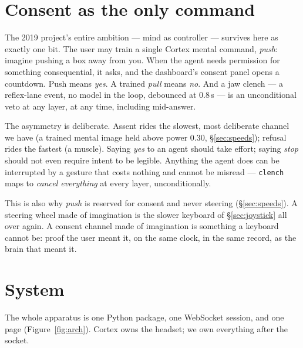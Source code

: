 \documentclass{article}
\begin{document}
\section{Consent as the only command}
\label{sec:consent}

The 2019 project's entire ambition --- mind as controller --- survives here as exactly one bit. The user may train a single Cortex mental command, \emph{push}: imagine pushing a box away from you. When the agent needs permission for something consequential, it asks, and the dashboard's consent panel opens a countdown. Push means \emph{yes}. A trained \emph{pull} means \emph{no}. And a jaw clench --- a reflex-lane event, no model in the loop, debounced at 0.8\,s --- is an unconditional veto at any layer, at any time, including mid-answer.

The asymmetry is deliberate. Assent rides the slowest, most deliberate channel we have (a trained mental image held above power 0.30, \S\ref{sec:speeds}); refusal rides the fastest (a muscle). Saying \emph{yes} to an agent should take effort; saying \emph{stop} should not even require intent to be legible. Anything the agent does can be interrupted by a gesture that costs nothing and cannot be misread --- \texttt{clench} maps to \emph{cancel everything} at every layer, unconditionally.

This is also why \emph{push} is reserved for consent and never steering (\S\ref{sec:speeds}). A steering wheel made of imagination is the slower keyboard of \S\ref{sec:joystick} all over again. A consent channel made of imagination is something a keyboard cannot be: proof the user meant it, on the same clock, in the same record, as the brain that meant it.

\section{System}
\label{sec:system}

The whole apparatus is one Python package, one WebSocket session, and one page (Figure~\ref{fig:arch}). Cortex owns the headset; we own everything after the socket.
\end{document}
